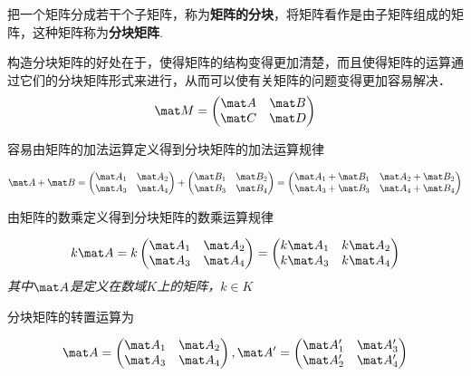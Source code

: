 

把一个矩阵分成若干个子矩阵，称为\textbf{矩阵的分块}，将矩阵看作是由子矩阵组成的矩阵，这种矩阵称为\textbf{分块矩阵}.

构造分块矩阵的好处在于，使得矩阵的结构变得更加清楚，而且使得矩阵的运算通过它们的分块矩阵形式来进行，从而可以使有关矩阵的问题变得更加容易解决．
\begin{equation}
\mat M=
\begin{pmatrix}
\mat A & \mat B\\
\mat C & \mat D
\end{pmatrix}
\end{equation}

容易由矩阵的加法运算定义得到分块矩阵的加法运算规律

\begin{equation}
\mat A+\mat B=
\begin{pmatrix}
\mat A_1 & \mat A_2\\
\mat A_3 & \mat A_4
\end{pmatrix}
+
\begin{pmatrix}
\mat B_1 & \mat B_2\\
\mat B_3 & \mat B_4
\end{pmatrix}
=
\begin{pmatrix}
\mat A_1+\mat B_1 & \mat A_2+\mat B_2\\
\mat A_3+\mat B_3 & \mat A_4+\mat B_4
\end{pmatrix}
\end{equation}

由矩阵的数乘定义得到分块矩阵的数乘运算规律

\begin{equation}
k\mat A=
k\begin{pmatrix}
\mat A_1 & \mat A_2\\
\mat A_3 & \mat A_4
\end{pmatrix}
=
\begin{pmatrix}
k\mat A_1 & k\mat A_2\\
k\mat A_3 & k\mat A_4
\end{pmatrix}
\end{equation}
\textsl{其中$\mat A$是定义在数域$K$上的矩阵，$k\in{K}$}

分块矩阵的转置运算为

\begin{equation}
\mat A=
\begin{pmatrix}
\mat A_1 & \mat A_2\\
\mat A_3 & \mat A_4
\end{pmatrix}
,
\mat A'
=
\begin{pmatrix}
\mat A_1' & \mat A_3'\\
\mat A_2' & \mat A_4'
\end{pmatrix}
\end{equation}

